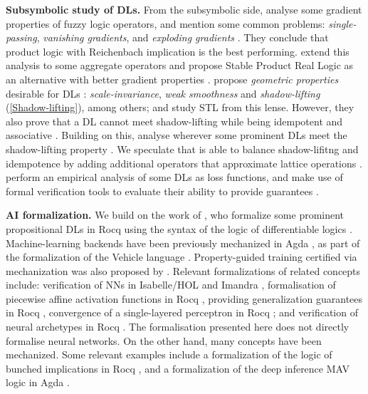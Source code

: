 \textbf{Subsymbolic study of DLs.} From the subsymbolic side, \citeauthor{van2022analyzing} analyse some gradient properties of fuzzy logic operators, and mention some common problems: \emph{single-passing}, \emph{vanishing gradients}, and \emph{exploding gradients} \cite{van2022analyzing}. They conclude that product logic with Reichenbach implication is the best performing. \citeauthor{badreddine2022logic} extend this analysis to some aggregate operators and propose Stable Product Real Logic as an alternative with better gradient properties \citep{badreddine2022logic}. \citeauthor{varnai2020robustness} propose \emph{geometric properties} desirable for DLs \citep{varnai2020robustness}:  \emph{scale-invariance}, \emph{weak smoothness} and \emph{shadow-lifting} (\cref{Shadow-lifting}), among others;  and study STL \citep{varnai2020robustness} from this lense. However, they also prove that a DL cannot meet shadow-lifting while being idempotent and associative \citep{varnai2020robustness}. Building on this, \citeauthor{affeldt2024taming} analyse wherever some prominent DLs  meet the shadow-lifting property \citep{affeldt2024taming, varnai2020robustness}. We speculate that \citeauthor{capucci2024quantifiers} is able to balance shadow-lifitng and idempotence by adding additional operators that approximate lattice operations \citep{capucci2024quantifiers}. \citeauthor{FLINKOW2025103280} perform an empirical analysis of some DLs as loss functions, and make use of formal verification tools to evaluate their ability to provide guarantees \citep{FLINKOW2025103280}. 

\textbf{AI formalization.} We build on the work of \citeauthor{affeldt2024taming}, who formalize some prominent propositional DLs in Rocq \citep{affeldt2024taming} using the syntax of the logic of differentiable logics \cite{slusarz2023logic}. Machine-learning backends have been previously mechanized in Agda \citep{agdaDL}, as part of the formalization of the Vehicle language \citep{vehicle}.  Property-guided training certified via mechanization was also proposed by \citeauthor{chevallier2022constrainedtrainingneuralnetworks} \citep{chevallier2022constrainedtrainingneuralnetworks}. Relevant formalizations of \SuAI{} related concepts include: verification of NNs in Isabelle/HOL \citep{10.1007/978-3-031-27481-7_24} and Imandra \citep{10.1145/3551357.3551372}, formalisation of piecewise affine activation functions in Rocq \citep{10.1007/978-3-031-33170-1_4}, providing generalization guarantees in Rocq \citep{Bagnall_Stewart_2019}, convergence of a single-layered perceptron in Rocq \citep{10.1145/3088525.3088673}; and verification of neural archetypes in Rocq \citep{DeMaria2021}. The formalisation presented here does not directly formalise neural networks. On the other hand, many \SiAI{} concepts have been mechanized. Some relevant examples include a formalization of the logic of bunched implications in Rocq \citep{10.1145/3497775.3503690}, and a formalization of the deep inference MAV logic in Agda \citep{Atkey2024}. 
